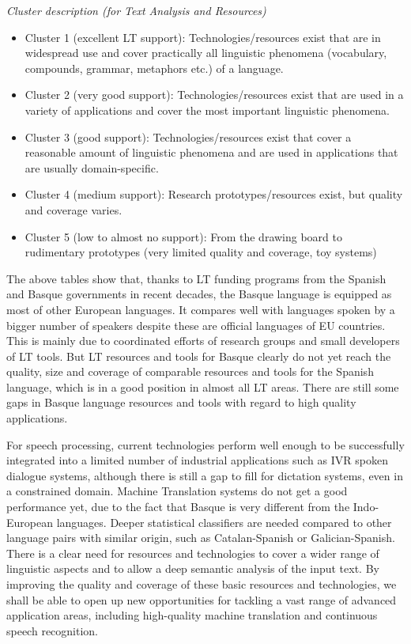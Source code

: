 \begin{multicols}{2}
   \textit{Cluster description (for Text Analysis and Resources)}
    \begin{itemize}
      \item Cluster 1 (excellent LT support): Technologies/resources exist that are in widespread use and cover practically all linguistic phenomena (vocabulary, compounds, grammar, metaphors etc.) of a language.
      \item Cluster 2 (very good support): Technologies/resources exist that are used in a variety of applications and cover the most important linguistic phenomena. 
      \item Cluster 3 (good support): Technologies/resources exist that cover a reasonable amount of linguistic phenomena and are used in applications that are usually domain-specific.
      \item Cluster 4 (medium support): Research prototypes/resources exist, but quality and coverage varies.
      \item Cluster 5 (low to almost no support): From the drawing board to rudimentary prototypes (very limited quality and coverage, toy systems)
    \end{itemize}
    The above tables show that, thanks to LT funding programs from the Spanish and Basque governments in recent decades, the Basque language is equipped as most of other European languages. It compares well with languages spoken by a bigger number of speakers despite these are official languages of EU countries. This is mainly due to coordinated efforts of research groups and small developers of LT tools. But LT resources and tools for Basque clearly do not yet reach the quality, size and coverage of comparable resources and tools for the Spanish language, which is in a good position in almost all LT areas. There are still some gaps in Basque language resources and tools with regard to high quality applications. 

    For speech processing, current technologies perform well enough to be successfully integrated into a limited number of industrial applications such as IVR spoken dialogue systems, although there is still a gap to fill for dictation systems, even in a constrained domain. Machine Translation systems do not get a good performance yet, due to the fact that Basque is very different from the Indo-European languages. Deeper statistical classifiers are needed compared to other language pairs with similar origin, such as Catalan-Spanish or Galician-Spanish. There is a clear need for resources and technologies to cover a wider range of linguistic aspects and to allow a deep semantic analysis of the input text. By improving the quality and coverage of these basic resources and technologies, we shall be able to open up new opportunities for tackling a vast range of advanced application areas, including high-quality machine translation and continuous speech recognition.  


\end{multicols}
